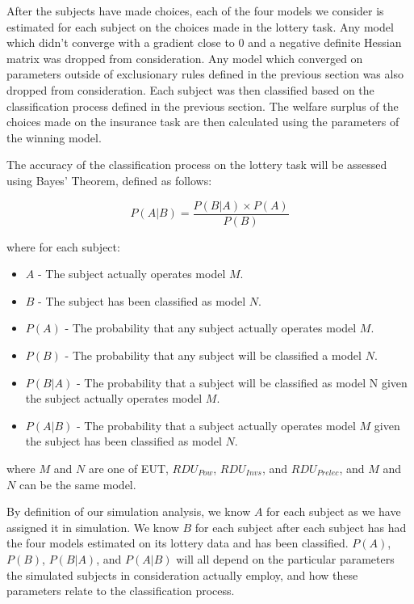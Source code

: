 \documentclass[../main.tex]{subfiles}
\begin{document}
After the subjects have made choices, each of the four models we consider is estimated for each subject on the choices made in the lottery task.
Any model which didn't converge with a gradient close to 0 and a negative definite Hessian matrix was dropped from consideration.
Any model which converged on parameters outside of exclusionary rules defined in the previous section was also dropped from consideration.
Each subject was then classified based on the classification process defined in the previous section.
The welfare surplus of the choices made on the insurance task are then calculated using the parameters of the winning model.

The accuracy of the classification process on the lottery task will be assessed using Bayes' Theorem, defined as follows:

\begin{equation}
	\label{eq4:bayes}
	P(A|B) = \frac{P(B|A) \times P(A)}{P(B)}
\end{equation}

\noindent where for each subject:

\begin{itemize}
	\item $A$ - The subject actually operates model $M$.
	\item $B$ - The subject has been classified as model $N$.
	\item $P(A)$ - The probability that any subject actually operates model $M$.
	\item $P(B)$ - The probability that any subject will be classified a model $N$.
	\item $P(B|A)$ - The probability that a subject will be classified as model N given the subject actually operates model $M$.
	\item $P(A|B)$ - The probability that a subject actually operates model $M$ given the subject has been classified as model $N$.
\end{itemize}

\noindent where $M$ and $N$ are one of EUT, $\mathit{RDU_{Pow}}$, $\mathit{RDU_{Invs}}$, and $\mathit{RDU_{Prelec}}$, and $M$ and $N$ can be the same model.

By definition of our simulation analysis, we know $A$ for each subject as we have assigned it in simulation.
We know $B$ for each subject after each subject has had the four models estimated on its lottery data and has been classified.
$P(A)$, $P(B)$, $P(B|A)$, and $P(A|B)$ will all depend on the particular parameters the simulated subjects in consideration actually employ, and how these parameters relate to the classification process.
\end{document}
